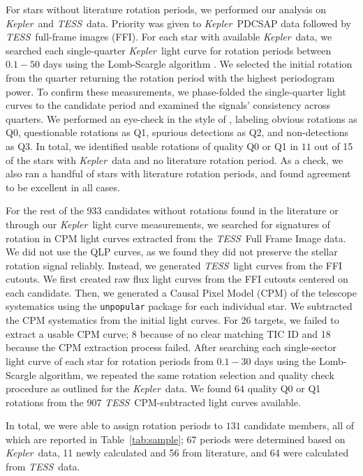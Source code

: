 \documentclass[twocolumn, linenumbers]{aastex631}
\newcommand{\kepler}{{\it Kepler}}
\newcommand{\tess}{\textit{TESS}}
\begin{document}
For stars without literature rotation periods, we performed our analysis on \kepler\ and \tess\ data. Priority was given to \kepler\ PDCSAP data followed by \tess\ full-frame images (FFI). For each star with available \kepler\ data, we searched each single-quarter \kepler\ light curve for rotation periods between $0.1-50$ days using the Lomb-Scargle algorithm \citep{LombScargle}. We selected the initial rotation from the quarter returning the rotation period with the highest periodogram power. To confirm these measurements, we phase-folded the single-quarter light curves to the candidate period and examined the signals' consistency across quarters. We performed an eye-check in the style of \citet{2021ApJ...921..167R}, labeling obvious rotations as Q0, questionable rotations as Q1, spurious detections as Q2, and non-detections as Q3. In total, we identified usable rotations of quality Q0 or Q1 in $11$ out of 15 of the stars with \kepler\ data and no literature rotation period. As a check, we also ran a handful of stars with literature rotation periods, and found agreement to be excellent in all cases.

For the rest of the 933 candidates without rotations found in the literature or through our \kepler\ light curve measurements, we searched for signatures of rotation in CPM light curves extracted from the \tess\ Full Frame Image data. We did not use the QLP curves, as we found they did not preserve the stellar rotation signal reliably. Instead, we generated \tess\ light curves from the FFI cutouts. We first created raw flux light curves from the FFI cutouts centered on each candidate. Then, we generated a Causal Pixel Model (CPM) of the telescope systematics using the \texttt{unpopular} package \citep{2021arXiv210615063H} for each individual star. We subtracted the CPM systematics from the initial light curves. For 26 targets, we failed to extract a usable CPM curve; 8 because of no clear matching TIC ID and 18 because the CPM extraction process failed. After searching each single-sector light curve of each star for rotation periods from $0.1-30$ days using the Lomb-Scargle algorithm, we repeated the same rotation selection and quality check procedure as outlined for the \kepler\ data. We found $64$ quality Q0 or Q1 rotations from the 907 \tess\ CPM-subtracted light curves available. 

In total, we were able to assign rotation periods to $131$ candidate members, all of which are reported in Table~\ref{tab:sample}; 67 periods were determined based on \kepler\ data, 11 newly calculated and 56 from literature, and 64 were calculated from \tess\ data.
\end{document}
